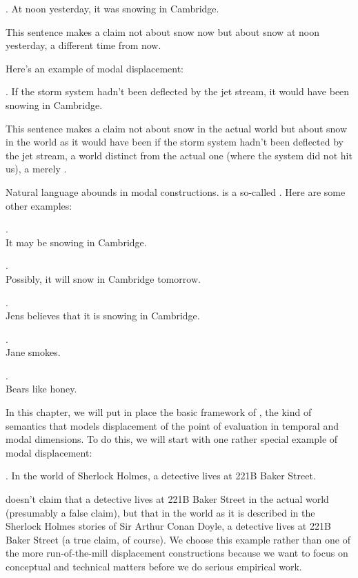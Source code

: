 \ex. At noon yesterday, it was snowing in Cambridge.

This sentence makes a claim not about snow now but about snow at noon yesterday,
a different time from now.

Here's an example of modal displacement:

\ex. If the storm system hadn't been deflected by the jet stream, it would have
been snowing in Cambridge.

This sentence makes a claim not about snow in the actual world but about snow in
the world as it would have been if the storm system hadn't been deflected by the
jet stream, a world distinct from the actual one (where the system did not hit
us), a merely .

Natural %
%
language abounds in modal constructions. \Last is a so-called
. Here are some other examples:

\ex. \\
It may be snowing in Cambridge.

\ex. \\
Possibly, it will snow in Cambridge tomorrow.

\ex. \\
Jens believes that it is snowing in Cambridge.

\ex. \\
Jane smokes.

\ex. \\
Bears like honey.


In this chapter, we will put in place the basic framework of , the kind of semantics that models displacement of the point of
evaluation in temporal and modal dimensions. To do this, we will start with one
rather special example of modal displacement:

\ex.\label{sherlock} In the world of Sherlock Holmes, a detective
lives at 221B Baker Street.

\Last{} doesn't claim that a
detective lives at 221B Baker Street in the actual world (presumably a false
claim), but that in the world as it is described in the Sherlock Holmes stories
of Sir Arthur Conan Doyle, a detective lives at 221B Baker Street (a true claim,
of course). We choose this example rather than one of the more run-of-the-mill
displacement constructions because we want to focus on conceptual and technical
matters before we do serious empirical work.

